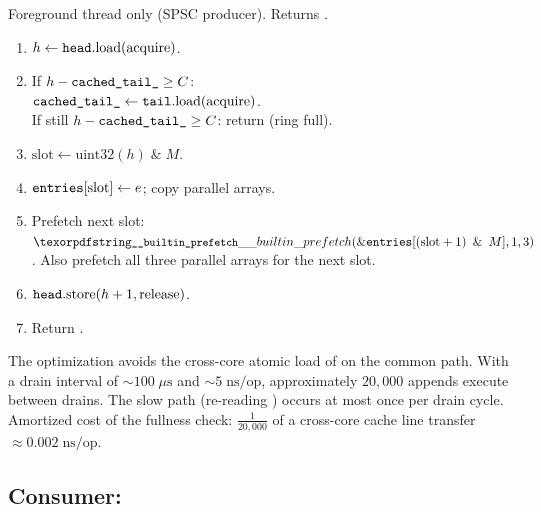 \begin{algorithm_spec}
\label{alg:try-append}
Foreground thread only (SPSC producer).  Returns .

\begin{enumerate}
  \item $h \leftarrow \texttt{head}.\text{load(acquire)}$.
  \item If $h - \texttt{cached\_tail\_} \ge C$: \\
    \quad $\texttt{cached\_tail\_} \leftarrow \texttt{tail}.\text{load(acquire)}$. \\
    \quad If still $h - \texttt{cached\_tail\_} \ge C$: return  (ring full).
  \item $\text{slot} \leftarrow \text{uint32}(h) \;\mathbin{\&}\; M$.
  \item $\texttt{entries}[\text{slot}] \leftarrow e$; copy parallel arrays.
  \item Prefetch next slot: $\code{\_\_builtin\_prefetch}(\&\field{entries}[(\text{slot}+1) \;\mathbin{\&}\; M], 1, 3)$.
    Also prefetch all three parallel arrays for the next slot.
  \item $\texttt{head}.\text{store}(h+1, \text{release})$.
  \item Return .
\end{enumerate}
\end{algorithm_spec}

\begin{property}
\label{prop:amortized-tail}
The  optimization avoids the cross-core atomic
load of  on the common path.  With a drain interval of
${\sim}100\;\mu\text{s}$ and ${\sim}5\;\text{ns/op}$, approximately
$20{,}000$ appends execute between drains.  The slow path (re-reading
) occurs at most once per drain cycle.  Amortized cost
of the fullness check: $\frac{1}{20{,}000}$ of a cross-core cache line transfer
$\approx 0.002\;\text{ns/op}$.
\end{property}

\subsection{Consumer: }


